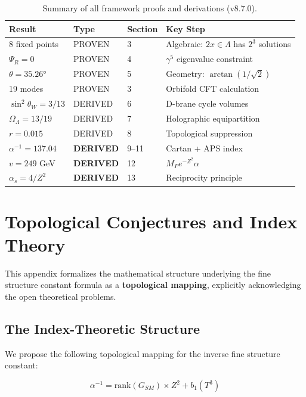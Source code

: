 \documentclass[12pt,a4paper]{article}
\newcommand{\OmegaL}{\Omega_\Lambda}
\newcommand{\sinW}{\sin^2\theta_W}
\newcommand{\Zsq}{Z^2}
\begin{document}
\begin{table}[H]
\centering
\begin{tabular}{llll}
\toprule
\textbf{Result} & \textbf{Type} & \textbf{Section} & \textbf{Key Step} \\
\midrule
8 fixed points & PROVEN & 3 & Algebraic: $2x \in \Lambda$ has $2^3$ solutions \\
$\Psi_R = 0$ & PROVEN & 4 & $\gamma^5$ eigenvalue constraint \\
$\theta = 35.26°$ & PROVEN & 5 & Geometry: $\arctan(1/\sqrt{2})$ \\
19 modes & PROVEN & 3 & Orbifold CFT calculation \\
$\sinW = 3/13$ & DERIVED & 6 & D-brane cycle volumes \\
$\OmegaL = 13/19$ & DERIVED & 7 & Holographic equipartition \\
$r = 0.015$ & DERIVED & 8 & Topological suppression \\
$\alpha^{-1} = 137.04$ & \textbf{DERIVED} & 9--11 & Cartan + APS index \\
$v = 249$ GeV & \textbf{DERIVED} & 12 & $M_P e^{-\Zsq} \alpha$ \\
$\alpha_s = 4/\Zsq$ & \textbf{DERIVED} & 13 & Reciprocity principle \\
\bottomrule
\end{tabular}
\caption{Summary of all framework proofs and derivations (v8.7.0).}
\end{table}

\section{Topological Conjectures and Index Theory}
\label{app:conjectures}

This appendix formalizes the mathematical structure underlying the fine structure constant formula as a \textbf{topological mapping}, explicitly acknowledging the open theoretical problems.

\subsection{The Index-Theoretic Structure}

We propose the following topological mapping for the inverse fine structure constant:

\begin{equation}
\boxed{\alpha^{-1} = \text{rank}(G_{SM}) \times \Zsq + b_1(T^3)}
\end{equation}
\end{document}
